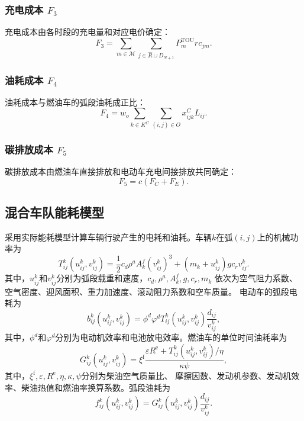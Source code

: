 \subsubsection{充电成本 $F_3$}

充电成本由各时段的充电量和对应电价确定\cite{ref:96}：
\begin{equation}
F_3=\sum_{m\in \mathcal M}\sum_{j\in\widehat R\cup D_{N+1}}
P_m^{\mathrm{TOU}}rc_{jm}.
\label{eq:deng-41}
\end{equation}

\subsubsection{油耗成本 $F_4$}

油耗成本与燃油车的弧段油耗成正比\cite{ref:71}：
\begin{equation}
F_4=w_o\sum_{k\in K^C}\sum_{(i,j)\in O}x_{ijk}^CL_{ij}.
\label{eq:qiu-f4}
\end{equation}

\subsubsection{碳排放成本 $F_5$}

碳排放成本由燃油车直接排放和电动车充电间接排放共同确定\cite{ref:95}：
\begin{equation}
F_5=c(F_C+F_E).
\label{eq:gong-carbon-cost}
\end{equation}

\subsection{混合车队能耗模型}
\label{sec:energy-model}

采用实际能耗模型计算车辆行驶产生的电耗和油耗\cite{ref:23}。车辆$k$在弧$(i,j)$上的机械功率为
\begin{equation}
T_{ij}^{k}(u_{ij}^{k},v_{ij}^{k})
=\frac{1}{2}c_d\rho^a A_k^f(v_{ij}^{k})^3
+(m_k+u_{ij}^{k})gc_rv_{ij}^{k}.
\label{eq:chen-power}
\end{equation}
其中，$u_{ij}^{k}$和$v_{ij}^{k}$分别为弧段载重和速度，$c_d,\rho^a,A_k^f,g,c_r,m_k$
依次为空气阻力系数、空气密度、迎风面积、重力加速度、滚动阻力系数和空车质量。
电动车的弧段电耗为
\begin{equation}
b_{ij}^{k}(u_{ij}^{k},v_{ij}^{k})
=\phi^{d}\varphi^{d}T_{ij}^{k}(u_{ij}^{k},v_{ij}^{k})\frac{d_{ij}}{v_{ij}^{k}},
\label{eq:chen-electricity}
\end{equation}
其中，$\phi^d$和$\varphi^d$分别为电动机效率和电池放电效率。燃油车的单位时间油耗率为
\begin{equation}
G_{ij}^{k}(u_{ij}^{k},v_{ij}^{k})
=\xi^{\mathrm f}\frac{\varepsilon R^{\mathrm e}+T_{ij}^{k}(u_{ij}^{k},v_{ij}^{k})/\eta}{\kappa\psi},
\label{eq:chen-fuel-rate}
\end{equation}
其中，$\xi^{\mathrm f},\varepsilon,R^{\mathrm e},\eta,\kappa,\psi$分别为柴油空气质量比、
摩擦因数、发动机参数、发动机效率、柴油热值和燃油率换算系数。弧段油耗为
\begin{equation}
f_{ij}^{k}(u_{ij}^{k},v_{ij}^{k})
=G_{ij}^{k}(u_{ij}^{k},v_{ij}^{k})\frac{d_{ij}}{v_{ij}^{k}}.
\label{eq:chen-fuel}
\end{equation}

